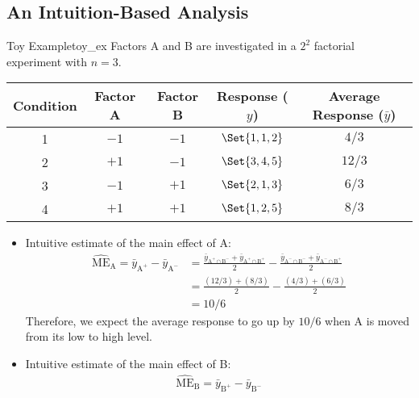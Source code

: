 \subsection{An Intuition-Based Analysis}
\begin{Example}{Toy Example}{toy_ex}
      Factors A and B are investigated in a $ 2^2 $ factorial experiment with $ n=3 $.
      \begin{center}
            \begin{tabular}{ccccc}
                  \toprule
                  Condition & Factor A & Factor B & Response ($ y $) & Average Response ($ \bar{y} $) \\
                  \midrule
                  1         & $ -1 $   & $ -1 $   & $ \Set{1,1,2} $  & $ 4/3 $                        \\
                  2         & $ +1 $   & $ -1 $   & $ \Set{3,4,5} $  & $ 12/3 $                       \\
                  3         & $ -1 $   & $ +1 $   & $ \Set{2,1,3} $  & $ 6/3 $                        \\
                  4         & $ +1 $   & $ +1 $   & $ \Set{1,2,5} $  & $ 8/3 $                        \\
                  \bottomrule
            \end{tabular}
      \end{center}
      \begin{itemize}
            \item Intuitive estimate of the main effect of A\@:
                  \begin{align*}
                        \widehat{\text{ME}}_{\text{A}}=\bar{y}_{\text{A}^+}-\bar{y}_{\text{A}^-}
                         & =\frac{\bar{y}_{\text{A}^+\cap \text{B}^-}+\bar{y}_{\text{A}^+\cap \text{B}^+}}{2}
                        -\frac{\bar{y}_{\text{A}^-\cap \text{B}^-}+\bar{y}_{\text{A}^-\cap \text{B}^+}}{2}    \\
                         & =\frac{(12/3)+(8/3)}{2}-\frac{(4/3)+(6/3)}{2}                                      \\
                         & =10/6
                  \end{align*}
                  Therefore, we expect the average response to go up by $ 10/6 $ when A is moved from its low to high level.
            \item Intuitive estimate of the main effect of B\@:
                  \begin{align*}
                        \widehat{\text{ME}}_{\text{B}}=\bar{y}_{\text{B}^+}-\bar{y}_{\text{B}^-}

\end{align*}
\end{itemize}
\end{Example}
